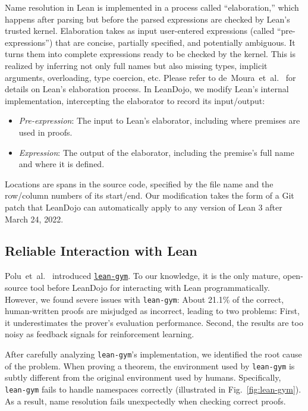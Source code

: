 Name resolution in Lean is implemented in a process called ``elaboration,'' which happens after parsing but before the parsed expressions are checked by Lean's trusted kernel. Elaboration takes as input user-entered expressions (called ``pre-expressions'') that are concise, partially specified, and potentially ambiguous. It turns them into complete expressions ready to be checked by the kernel. This is realized by inferring not only full names but also missing types, implicit arguments, overloading, type coercion, etc. Please refer to de~Moura~et~al.~\cite{de2015elaboration} for details on Lean's elaboration process. In LeanDojo, we modify Lean's internal implementation, intercepting the elaborator to record its input/output:
\begin{itemize}[leftmargin=*]
\item \emph{Pre-expression}: The input to Lean's elaborator, including where premises are used in proofs.
\item \emph{Expression}: The output of the elaborator, including the premise's full name and where it is defined.
\end{itemize}
Locations are spans in the source code, specified by the file name and the row/column numbers of its start/end. Our modification takes the form of a Git patch that LeanDojo can automatically apply to any version of Lean 3 after March 24, 2022.


\subsection{Reliable Interaction with Lean}
\label{appendix:leandojo:interaction}

Polu~et~al.~\cite{polu2023formal} introduced 
\href{https://github.com/openai/lean-gym}{\texttt{lean-gym}}. To our knowledge, it is the only mature, open-source tool before LeanDojo for interacting with Lean programmatically. However, we found severe issues with \texttt{lean-gym}: About 21.1\% of the correct, human-written proofs are misjudged as incorrect, leading to two problems: First, it underestimates the prover's evaluation performance. Second, the results are too noisy as feedback signals for reinforcement learning.

After carefully analyzing \texttt{lean-gym}'s implementation, we identified the root cause of the problem. When proving a theorem, the environment used by \texttt{lean-gym} is subtly different from the original environment used by humans. Specifically, \texttt{lean-gym} fails to handle namespaces correctly (illustrated in Fig.~\ref{fig:lean-gym}). As a result, name resolution fails unexpectedly when checking correct proofs.

